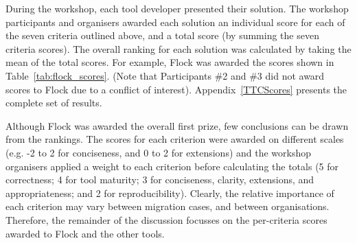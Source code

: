 During the workshop, each tool developer presented their solution. The workshop participants and organisers awarded each solution an individual score for each of the seven criteria outlined above, and a total score (by summing the seven criteria scores). The overall ranking for each solution was calculated by taking the mean of the total scores. For example, Flock was awarded the scores shown in Table~\ref{tab:flock_scores}. (Note that Participants \#2 and \#3 did not award scores to Flock due to a conflict of interest). Appendix~\ref{TTCScores} presents the complete set of results.

Although Flock was awarded the overall first prize, few conclusions can be drawn from the rankings. The scores for each criterion were awarded on different scales (e.g. -2 to 2 for conciseness, and 0 to 2 for extensions) and the workshop organisers applied a weight to each criterion before calculating the totals (5 for correctness; 4 for tool maturity; 3 for conciseness, clarity, extensions, and appropriateness; and 2 for reproducibility). Clearly, the relative importance of each criterion may vary between migration cases, and between organisations. Therefore, the remainder of the discussion focusses on the per-criteria scores awarded to Flock and the other tools.

